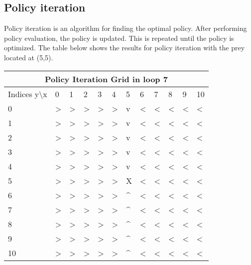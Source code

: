 \documentclass{article}
\begin{document}
\subsection*{Policy iteration}
Policy iteration is an algorithm for finding the optimal policy. After performing policy evaluation, the policy is updated. This is repeated until the policy is optimized. The table below shows the results for policy iteration with the prey located at (5,5).

\begin{center}
\begin{tabular}{ |l | l | l | l | l | l | l | l | l | l | l | l|}
\hline
\multicolumn{12}{|c|}{Policy Iteration Grid in loop 7}\\
\hline
Indices y\textbackslash x &0 & 1 & 2 & 3 & 4 & 5 & 6 & 7 & 8 & 9 & 10 \\ 

\hline
0 & \textgreater & \textgreater & \textgreater & \textgreater & \textgreater & v & \textless & \textless & \textless & \textless & \textless\\
1 & \textgreater & \textgreater & \textgreater & \textgreater & \textgreater & v & \textless & \textless & \textless & \textless & \textless\\
2 & \textgreater & \textgreater & \textgreater & \textgreater & \textgreater & v & \textless & \textless & \textless & \textless & \textless\\
3 & \textgreater & \textgreater & \textgreater & \textgreater & \textgreater & v & \textless & \textless & \textless & \textless & \textless\\
4 & \textgreater & \textgreater & \textgreater & \textgreater & \textgreater & v & \textless & \textless & \textless & \textless & \textless\\
5 & \textgreater & \textgreater & \textgreater & \textgreater & \textgreater & X & \textless & \textless & \textless & \textless & \textless\\
6 & \textgreater & \textgreater & \textgreater & \textgreater & \textgreater & \textasciicircum & \textless & \textless & \textless & \textless & \textless\\
7 & \textgreater & \textgreater & \textgreater & \textgreater & \textgreater & \textasciicircum & \textless & \textless & \textless & \textless & \textless\\
8 & \textgreater & \textgreater & \textgreater & \textgreater & \textgreater & \textasciicircum & \textless & \textless & \textless & \textless & \textless\\
9 & \textgreater & \textgreater & \textgreater & \textgreater & \textgreater & \textasciicircum & \textless & \textless & \textless & \textless & \textless\\
10 & \textgreater & \textgreater & \textgreater & \textgreater & \textgreater & \textasciicircum & \textless & \textless & \textless & \textless & \textless\\
\hline
\end{tabular}
\end{center}
\end{document}
